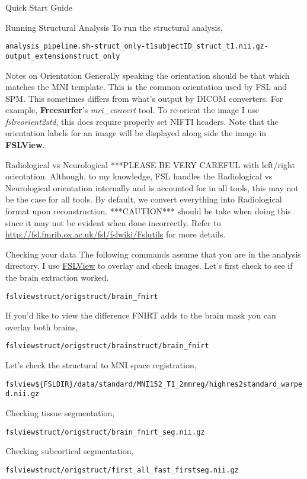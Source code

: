 \documentclass[]{report}
\begin{document}
\begin{chapter}{Quick Start Guide }
\begin{section}{Running Structural Analysis}
To run the structural analysis, 
\begin{alltt}
analysis_pipeline.sh -struct_only -t1 subjectID\_struct\_t1.nii.gz  -output\_extension struct\_only
\end{alltt}


\begin{subsection}{Notes on Orientation}
Generally speaking the orientation should be that which matches the MNI template. This is the common orientation used by FSL and SPM.  This sometimes differs from what's output by DICOM converters. For example, {\bf Freesurfer}'s {\it mri\_convert} tool. To re-orient the image I use  {\it fslreorient2std}, this does require properly set NIFTI headers. Note that the orientation labels for an image will be displayed along side the image in {\bf FSLView}.
\begin{subsubsection}{Radiological vs Neurological}
***PLEASE BE VERY CAREFUL with left/right orientation. Although, to my knowledge, FSL handles the Radiological vs Neurological orientation internally and is accounted for in all tools, this may not be the case for all tools.  By default, we convert everything into Radiological format upon reconstruction. ***CAUTION***  should be take when doing this since it may not be evident when done incorrectly. Refer to \url{http://fsl.fmrib.ox.ac.uk/fsl/fslwiki/Fslutils} for more details. 

\end{subsubsection}
\end{subsection}

\begin{subsection}{Checking your data}
The following commands assume that you are in the analysis directory. I use \href{fsl.fmrib.ox.ac.uk/fsl/fslview}{FSLView} to overlay 
and check images. 
Let's first check to see if the brain extraction worked. 
\begin{alltt}
\indent fslview struct/orig struct/brain\_fnirt
\end{alltt}
If you'd like to view the difference FNIRT adds to the brain mask you can overlay both brains,
 \begin{alltt}
\indent  fslview struct/orig  struct/brain struct/brain\_fnirt
\end{alltt}
Let's check the structural to MNI space registration,
 \begin{alltt}
\indent  fslview \$\{FSLDIR\}/data/standard/MNI152_T1_2mm  reg/highres2standard_warped.nii.gz
\end{alltt}
Checking tissue segmentation,
 \begin{alltt}
\indent  fslview struct/orig  struct/brain\_fnirt\_seg.nii.gz
\end{alltt}
Checking subcortical segmentation,
 \begin{alltt}
\indent  fslview struct/orig  struct/first\_all\_fast\_firstseg.nii.gz 
\end{alltt}


\end{subsection}
\end{section}
\end{chapter}
\end{document}
